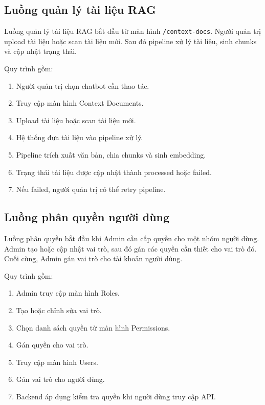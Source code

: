 \subsection{Luồng quản lý tài liệu RAG}

Luồng quản lý tài liệu RAG bắt đầu từ màn hình \texttt{/context-docs}. Người quản trị upload tài liệu hoặc scan tài liệu mới. Sau đó pipeline xử lý tài liệu, sinh chunks và cập nhật trạng thái.

Quy trình gồm:

\begin{enumerate}
    \item Người quản trị chọn chatbot cần thao tác.
    \item Truy cập màn hình Context Documents.
    \item Upload tài liệu hoặc scan tài liệu mới.
    \item Hệ thống đưa tài liệu vào pipeline xử lý.
    \item Pipeline trích xuất văn bản, chia chunks và sinh embedding.
    \item Trạng thái tài liệu được cập nhật thành processed hoặc failed.
    \item Nếu failed, người quản trị có thể retry pipeline.
\end{enumerate}

\subsection{Luồng phân quyền người dùng}

Luồng phân quyền bắt đầu khi Admin cần cấp quyền cho một nhóm người dùng. Admin tạo hoặc cập nhật vai trò, sau đó gán các quyền cần thiết cho vai trò đó. Cuối cùng, Admin gán vai trò cho tài khoản người dùng.

Quy trình gồm:

\begin{enumerate}
    \item Admin truy cập màn hình Roles.
    \item Tạo hoặc chỉnh sửa vai trò.
    \item Chọn danh sách quyền từ màn hình Permissions.
    \item Gán quyền cho vai trò.
    \item Truy cập màn hình Users.
    \item Gán vai trò cho người dùng.
    \item Backend áp dụng kiểm tra quyền khi người dùng truy cập API.
\end{enumerate}

